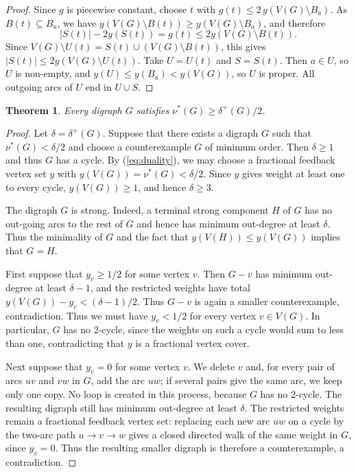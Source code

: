 \documentclass[a4paper,12pt]{article}
\newtheorem{theorem}{Theorem}[section]
\numberwithin{equation}{section}
\begin{document}
\begin{proof}
Since $g$ is piecewise constant, choose $t$ with
$g(t)\le 2\,y(V(G)\setminus B_a)$. As $B(t)\subseteq B_a$, we have
$y(V(G)\setminus B(t))\ge y(V(G)\setminus B_a)$, and therefore
$$
|S(t)|-2y(S(t))=g(t)\le 2y(V(G)\setminus B(t)).
$$
Since $V(G)\setminus U(t)=S(t)\cup(V(G)\setminus B(t))$, this gives $
|S(t)|\le 2y(V(G)\setminus U(t))$. Take $U=U(t)$ and $S=S(t)$. Then $a\in U$, so $U$ is non-empty, and
$y(U)\le y(B_a)<y(V(G))$, so $U$ is proper. All outgoing arcs of $U$
end in $U\cup S$.
\end{proof}


\begin{theorem}\label{thm:fractional}
Every digraph $G$ satisfies $\nu^\ast(G)\ge\delta^+(G)/2$.
\end{theorem}


\begin{proof}
Let $\delta=\delta^+(G)$. Suppose that there exists a digraph $G$ such that $\nu^\ast(G)<\delta/2$ and choose a counterexample $G$ of minimum order. Then $\delta\ge 1$ and thus $G$ has a cycle. 
 By (\ref{eq:duality}), we may choose a
fractional feedback vertex set $y$ with 
$y(V(G))=\nu^\ast(G)<\delta/2$. Since $y$ gives weight at least one to every cycle, $y(V(G))\ge1$, and
hence $\delta\ge3$.

The digraph $G$ is strong. Indeed, a terminal strong component $H$ of $G$ has no out-going 
arcs to the rest of $G$ and hence has  minimum out-degree at least $\delta$. Thus the minimality of $G$ and the fact that $y(V(H))\leq y(V(G))$ implies that $G=H$.

First suppose that $y_v\ge1/2$ for some vertex $v$.
Then $G-v$ has minimum out-degree at least $\delta-1$, and the
restricted weights have total $y(V(G))-y_v<(\delta-1)/2$. Thus $G-v$ is again a smaller counterexample, contradiction. Thus we must have $y_v<1/2$ for every
vertex $v\in V(G)$. In particular, $G$ has no 2-cycle,
since the weights on such a cycle would sum to less than one, contradicting that $y$ is a fractional vertex cover.

Next suppose that $y_v=0$ for some vertex $v$. We delete $v$ and, for
every pair of arcs $uv$ and $vw$ in $G$, add the arc $uw$; if several
pairs give the same arc, we keep only one copy. No loop is created in
this process, because $G$ has no 2-cycle. The resulting digraph still has minimum out-degree at least $\delta$. The
restricted weights remain a fractional feedback vertex set: replacing each
new arc $uw$ on a cycle by the two-arc path $u\to v\to w$ gives a closed
directed walk of the same weight in $G$, since $y_v=0$.
Thus the resulting smaller digraph is therefore a counterexample, a
contradiction.


\end{proof}
\end{document}

